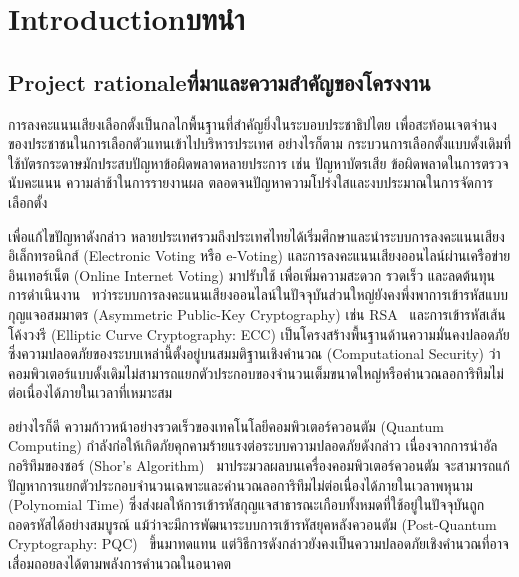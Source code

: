 \chapter{\ifenglish Introduction\else บทนำ\fi}

\section{\ifenglish Project rationale\else ที่มาและความสำคัญของโครงงาน\fi}
การลงคะแนนเสียงเลือกตั้งเป็นกลไกพื้นฐานที่สำคัญยิ่งในระบอบประชาธิปไตย เพื่อสะท้อนเจตจำนงของประชาชนในการเลือกตัวแทนเข้าไปบริหารประเทศ อย่างไรก็ตาม กระบวนการเลือกตั้งแบบดั้งเดิมที่ใช้บัตรกระดาษมักประสบปัญหาข้อผิดพลาดหลายประการ เช่น ปัญหาบัตรเสีย ข้อผิดพลาดในการตรวจนับคะแนน ความล่าช้าในการรายงานผล ตลอดจนปัญหาความโปร่งใสและงบประมาณในการจัดการเลือกตั้ง~\cite{ect_evoting_1, ect_evoting_2}

เพื่อแก้ไขปัญหาดังกล่าว หลายประเทศรวมถึงประเทศไทยได้เริ่มศึกษาและนำระบบการลงคะแนนเสียงอิเล็กทรอนิกส์ (Electronic Voting หรือ e-Voting) และการลงคะแนนเสียงออนไลน์ผ่านเครือข่ายอินเทอร์เน็ต (Online Internet Voting) มาปรับใช้ เพื่อเพิ่มความสะดวก รวดเร็ว และลดต้นทุนการดำเนินงาน~\cite{elect_in_th} ทว่าระบบการลงคะแนนเสียงออนไลน์ในปัจจุบันส่วนใหญ่ยังคงพึ่งพาการเข้ารหัสแบบกุญแจอสมมาตร (Asymmetric Public-Key Cryptography) เช่น RSA~\cite{rivest_rsa} และการเข้ารหัสเส้นโค้งวงรี (Elliptic Curve Cryptography: ECC) เป็นโครงสร้างพื้นฐานด้านความมั่นคงปลอดภัย ซึ่งความปลอดภัยของระบบเหล่านี้ตั้งอยู่บนสมมติฐานเชิงคำนวณ (Computational Security) ว่าคอมพิวเตอร์แบบดั้งเดิมไม่สามารถแยกตัวประกอบของจำนวนเต็มขนาดใหญ่หรือคำนวณลอการิทึมไม่ต่อเนื่องได้ภายในเวลาที่เหมาะสม

อย่างไรก็ดี ความก้าวหน้าอย่างรวดเร็วของเทคโนโลยีคอมพิวเตอร์ควอนตัม (Quantum Computing) กำลังก่อให้เกิดภัยคุกคามร้ายแรงต่อระบบความปลอดภัยดังกล่าว เนื่องจากการนำอัลกอริทึมของชอร์ (Shor's Algorithm)~\cite{shor_1994, nielsen_chuang} มาประมวลผลบนเครื่องคอมพิวเตอร์ควอนตัม จะสามารถแก้ปัญหาการแยกตัวประกอบจำนวนเฉพาะและคำนวณลอการิทึมไม่ต่อเนื่องได้ภายในเวลาพหุนาม (Polynomial Time) ซึ่งส่งผลให้การเข้ารหัสกุญแจสาธารณะเกือบทั้งหมดที่ใช้อยู่ในปัจจุบันถูกถอดรหัสได้อย่างสมบูรณ์ แม้ว่าจะมีการพัฒนาระบบการเข้ารหัสยุคหลังควอนตัม (Post-Quantum Cryptography: PQC)~\cite{nist_pqc} ขึ้นมาทดแทน แต่วิธีการดังกล่าวยังคงเป็นความปลอดภัยเชิงคำนวณที่อาจเสื่อมถอยลงได้ตามพลังการคำนวณในอนาคต

